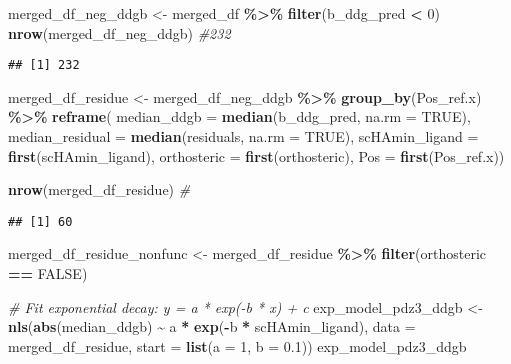 \documentclass[
]{article}
\newenvironment{Shaded}{\begin{snugshade}}{\end{snugshade}}
\newcommand{\AttributeTok}[1]{\textcolor[rgb]{0.13,0.29,0.53}{#1}}
\newcommand{\CommentTok}[1]{\textcolor[rgb]{0.56,0.35,0.01}{\textit{#1}}}
\newcommand{\ConstantTok}[1]{\textcolor[rgb]{0.56,0.35,0.01}{#1}}
\newcommand{\DecValTok}[1]{\textcolor[rgb]{0.00,0.00,0.81}{#1}}
\newcommand{\FloatTok}[1]{\textcolor[rgb]{0.00,0.00,0.81}{#1}}
\newcommand{\FunctionTok}[1]{\textcolor[rgb]{0.13,0.29,0.53}{\textbf{#1}}}
\newcommand{\NormalTok}[1]{#1}
\newcommand{\OtherTok}[1]{\textcolor[rgb]{0.56,0.35,0.01}{#1}}
\newcommand{\SpecialCharTok}[1]{\textcolor[rgb]{0.81,0.36,0.00}{\textbf{#1}}}
\begin{document}
\begin{Shaded}
\begin{Highlighting}[]
\NormalTok{merged\_df\_neg\_ddgb }\OtherTok{\textless{}{-}}\NormalTok{ merged\_df }\SpecialCharTok{\%\textgreater{}\%} \FunctionTok{filter}\NormalTok{(b\_ddg\_pred }\SpecialCharTok{\textless{}} \DecValTok{0}\NormalTok{)}
\FunctionTok{nrow}\NormalTok{(merged\_df\_neg\_ddgb) }\CommentTok{\#232}
\end{Highlighting}
\end{Shaded}

\begin{verbatim}
## [1] 232
\end{verbatim}

\begin{Shaded}
\begin{Highlighting}[]
\NormalTok{merged\_df\_residue }\OtherTok{\textless{}{-}}\NormalTok{ merged\_df\_neg\_ddgb }\SpecialCharTok{\%\textgreater{}\%}
  \FunctionTok{group\_by}\NormalTok{(Pos\_ref.x) }\SpecialCharTok{\%\textgreater{}\%}
  \FunctionTok{reframe}\NormalTok{(}
    \AttributeTok{median\_ddgb =} \FunctionTok{median}\NormalTok{(b\_ddg\_pred, }\AttributeTok{na.rm =} \ConstantTok{TRUE}\NormalTok{),}
    \AttributeTok{median\_residual =} \FunctionTok{median}\NormalTok{(residuals, }\AttributeTok{na.rm =} \ConstantTok{TRUE}\NormalTok{),}
    \AttributeTok{scHAmin\_ligand =} \FunctionTok{first}\NormalTok{(scHAmin\_ligand),}
    \AttributeTok{orthosteric =} \FunctionTok{first}\NormalTok{(orthosteric),}
    \AttributeTok{Pos =} \FunctionTok{first}\NormalTok{(Pos\_ref.x))}

\FunctionTok{nrow}\NormalTok{(merged\_df\_residue) }\CommentTok{\#}
\end{Highlighting}
\end{Shaded}

\begin{verbatim}
## [1] 60
\end{verbatim}

\begin{Shaded}
\begin{Highlighting}[]
\NormalTok{merged\_df\_residue\_nonfunc }\OtherTok{\textless{}{-}}\NormalTok{ merged\_df\_residue }\SpecialCharTok{\%\textgreater{}\%} \FunctionTok{filter}\NormalTok{(orthosteric }\SpecialCharTok{==} \ConstantTok{FALSE}\NormalTok{)}

\CommentTok{\# Fit exponential decay: y = a * exp({-}b * x) + c}
\NormalTok{exp\_model\_pdz3\_ddgb }\OtherTok{\textless{}{-}} \FunctionTok{nls}\NormalTok{(}\FunctionTok{abs}\NormalTok{(median\_ddgb) }\SpecialCharTok{\textasciitilde{}}\NormalTok{ a }\SpecialCharTok{*} \FunctionTok{exp}\NormalTok{(}\SpecialCharTok{{-}}\NormalTok{b }\SpecialCharTok{*}\NormalTok{ scHAmin\_ligand),}
                 \AttributeTok{data =}\NormalTok{ merged\_df\_residue,}
                 \AttributeTok{start =} \FunctionTok{list}\NormalTok{(}\AttributeTok{a =} \DecValTok{1}\NormalTok{, }\AttributeTok{b =} \FloatTok{0.1}\NormalTok{))}
\NormalTok{exp\_model\_pdz3\_ddgb}
\end{Highlighting}
\end{Shaded}
\end{document}
